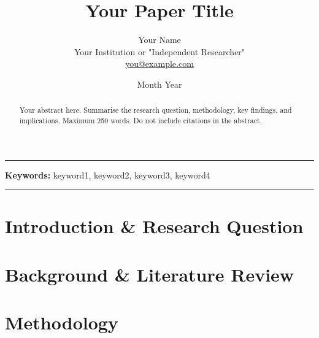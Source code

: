 \documentclass[12pt, a4paper]{article}
\title{Your Paper Title}
\author{
  Your Name \\
  \small Your Institution or "Independent Researcher" \\
  \small \href{mailto:you@example.com}{you@example.com}
}
\date{Month Year}
\begin{document}
\maketitle

\noindent\rule{\linewidth}{0.4pt}
\vspace{0.5em}


\begin{abstract}
\noindent
Your abstract here. Summarise the research question, methodology,
key findings, and implications. Maximum 250 words. Do not include
citations in the abstract.
\end{abstract}

\noindent\textbf{Keywords:} keyword1, keyword2, keyword3, keyword4

\noindent\rule{\linewidth}{0.4pt}
\vspace{1em}


\section{Introduction \& Research Question}
%

\section{Background \& Literature Review}
%

\section{Methodology}
%
\end{document}
